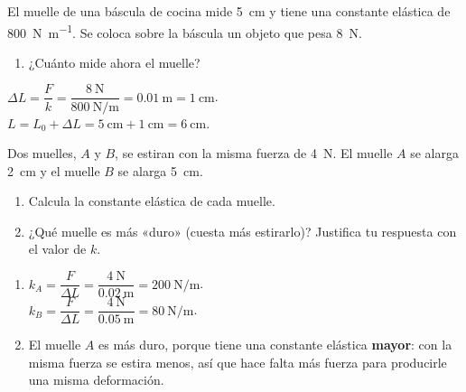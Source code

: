 \begin{exercise}
    El muelle de una báscula de cocina mide \qty{5}{\cm} y tiene una constante elástica de \qty{800}{\newton\per\metre}. Se coloca sobre la báscula un objeto que pesa \qty{8}{\newton}.
    \begin{enumerate}[label=\letraminuscula]
        \item ¿Cuánto mide ahora el muelle?
    \end{enumerate}
    \begin{solu}
        \(\Delta L = \dfrac{F}{k} = \dfrac{\qty{8}{\newton}}{\qty{800}{\newton\per\metre}} = \qty{0.01}{\m} = \qty{1}{\cm}\). \\
        \(L = L_0 + \Delta L = \qty{5}{\cm} + \qty{1}{\cm} = \qty{6}{\cm}\).
    \end{solu}
\end{exercise}

\begin{exercise}
    Dos muelles, \(A\) y \(B\), se estiran con la misma fuerza de \qty{4}{\newton}. El muelle \(A\) se alarga \qty{2}{\cm} y el muelle \(B\) se alarga \qty{5}{\cm}.
    \begin{enumerate}[label=\letraminuscula]
        \item Calcula la constante elástica de cada muelle.
        \item ¿Qué muelle es más «duro» (cuesta más estirarlo)? Justifica tu respuesta con el valor de \(k\).
    \end{enumerate}
    \begin{solu}
        \begin{enumerate}[label=\alph*)]
            \item \(k_A = \dfrac{F}{\Delta L} = \dfrac{\qty{4}{\newton}}{\qty{0.02}{\m}} = \qty{200}{\newton\per\metre}\). \\
            \(k_B = \dfrac{F}{\Delta L} = \dfrac{\qty{4}{\newton}}{\qty{0.05}{\m}} = \qty{80}{\newton\per\metre}\).
            \item El muelle \(A\) es más duro, porque tiene una constante elástica \textbf{mayor}: con la misma fuerza se estira menos, así que hace falta más fuerza para producirle una misma deformación.
        \end{enumerate}
    \end{solu}
\end{exercise}

